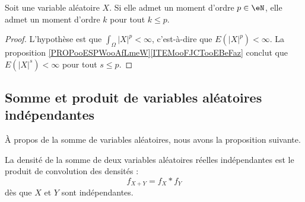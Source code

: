 \begin{proposition}		\label{PROPooIQGWooZeQJgb}
	Soit une variable aléatoire \( X\). Si elle admet un moment d'ordre \( p\in \eN\), elle admet un moment d'ordre \( k\) pour tout \( k\leq p\).
\end{proposition}

\begin{proof}
	L'hypothèse est que \( \int_{\Omega}| X |^p<\infty\), c'est-à-dire que \( E(| X |^p)<\infty\). La proposition \ref{PROPooESPWooAfLmeW}\ref{ITEMooFJCTooEBeFaz} conclut que \( E(| X |^s)<\infty\) pour tout \( s\leq p\).
\end{proof}

\subsection{Somme et produit de variables aléatoires indépendantes}
\label{subsecscnvommevariablsindep}

À propos de la somme de variables aléatoires, nous avons la proposition suivante.


\begin{proposition}		\label{PROPooBNUEooOUvpdp}
	La densité de la somme de deux variables aléatoires réelles indépendantes est le produit de convolution des densités :
	\begin{equation}
		f_{X+Y}=f_X* f_Y
	\end{equation}
	dès que \( X\) et \( Y\) sont indépendantes.
\end{proposition}

